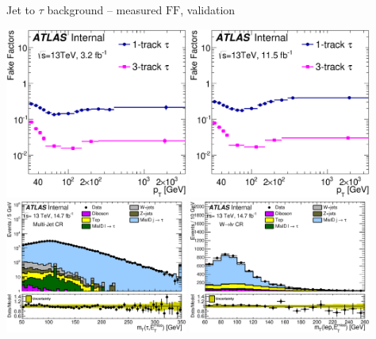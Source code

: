 \documentclass[10pt]{beamer}
\newcommand*{\FF}{\ensuremath{\text{FF}}}
\begin{document}
\begin{frame}{Jet to $\tau$ background -- measured \FF, validation}
\begin{center}
   \includegraphics[width=0.45\textwidth]{figures/GetTauFFmed2D_2015.eps}
   \includegraphics[width=0.45\textwidth]{figures/GetTauFFmed2D_2016.eps} \\
   \includegraphics[width=0.45\textwidth]{figures/DDQCD15_QCD_MT.eps}
   \includegraphics[width=0.45\textwidth]{figures/DDQCD15_FFWCR_WlepMT.eps}
\end{center}
\end{frame}
\end{document}
